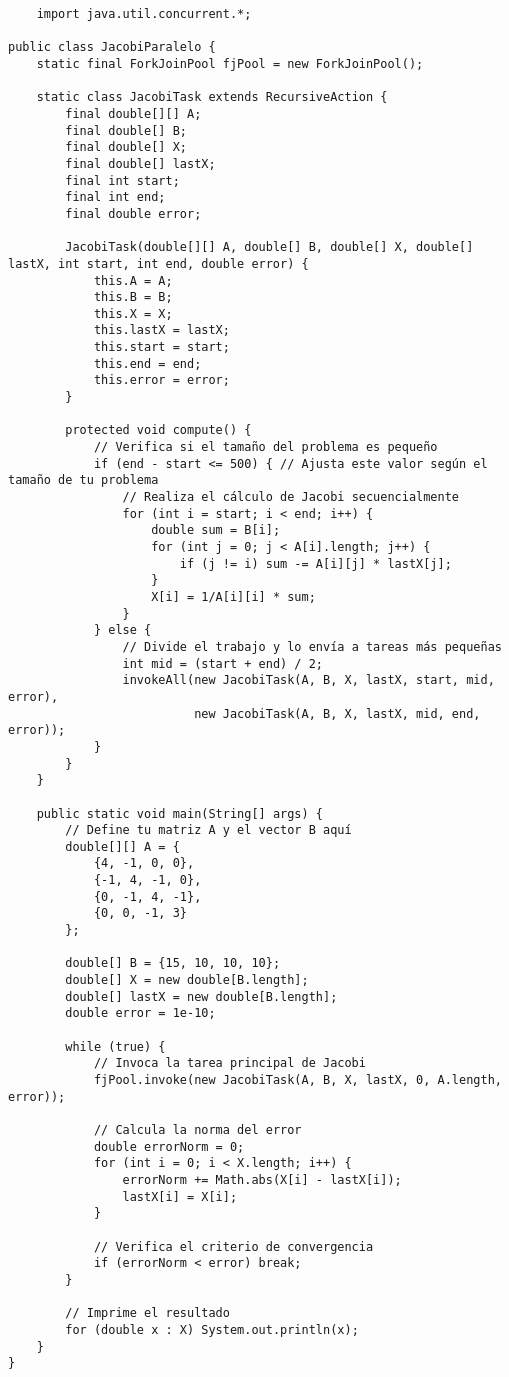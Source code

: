 \documentclass[]{article}
\begin{document}
\begin{verbatim}
    import java.util.concurrent.*;

public class JacobiParalelo {
    static final ForkJoinPool fjPool = new ForkJoinPool();

    static class JacobiTask extends RecursiveAction {
        final double[][] A;
        final double[] B;
        final double[] X;
        final double[] lastX;
        final int start;
        final int end;
        final double error;

        JacobiTask(double[][] A, double[] B, double[] X, double[] lastX, int start, int end, double error) {
            this.A = A;
            this.B = B;
            this.X = X;
            this.lastX = lastX;
            this.start = start;
            this.end = end;
            this.error = error;
        }

        protected void compute() {
            // Verifica si el tamaño del problema es pequeño
            if (end - start <= 500) { // Ajusta este valor según el tamaño de tu problema
                // Realiza el cálculo de Jacobi secuencialmente
                for (int i = start; i < end; i++) {
                    double sum = B[i];
                    for (int j = 0; j < A[i].length; j++) {
                        if (j != i) sum -= A[i][j] * lastX[j];
                    }
                    X[i] = 1/A[i][i] * sum;
                }
            } else {
                // Divide el trabajo y lo envía a tareas más pequeñas
                int mid = (start + end) / 2;
                invokeAll(new JacobiTask(A, B, X, lastX, start, mid, error),
                          new JacobiTask(A, B, X, lastX, mid, end, error));
            }
        }
    }

    public static void main(String[] args) {
        // Define tu matriz A y el vector B aquí
        double[][] A = {
            {4, -1, 0, 0},
            {-1, 4, -1, 0},
            {0, -1, 4, -1},
            {0, 0, -1, 3}
        };
        
        double[] B = {15, 10, 10, 10};
        double[] X = new double[B.length];
        double[] lastX = new double[B.length];
        double error = 1e-10;

        while (true) {
            // Invoca la tarea principal de Jacobi
            fjPool.invoke(new JacobiTask(A, B, X, lastX, 0, A.length, error));

            // Calcula la norma del error
            double errorNorm = 0;
            for (int i = 0; i < X.length; i++) {
                errorNorm += Math.abs(X[i] - lastX[i]);
                lastX[i] = X[i];
            }

            // Verifica el criterio de convergencia
            if (errorNorm < error) break;
        }

        // Imprime el resultado
        for (double x : X) System.out.println(x);
    }
}

    \end{verbatim}
\end{document}
